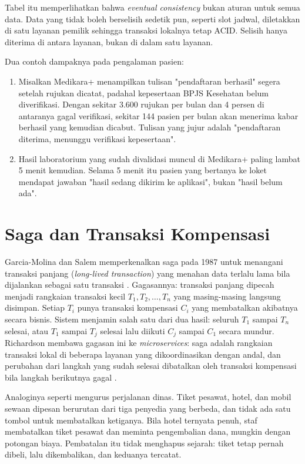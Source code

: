 Tabel itu memperlihatkan bahwa \textit{eventual consistency} bukan aturan untuk semua data. Data
yang tidak boleh berselisih sedetik pun, seperti slot jadwal, diletakkan di satu layanan pemilik
sehingga transaksi lokalnya tetap ACID. Selisih hanya diterima di antara layanan, bukan di dalam
satu layanan.

Dua contoh dampaknya pada pengalaman pasien:
\begin{enumerate}
  \item Misalkan Medikara+ menampilkan tulisan "pendaftaran berhasil" segera setelah rujukan
        dicatat, padahal kepesertaan BPJS Kesehatan belum diverifikasi. Dengan sekitar 3.600
        rujukan per bulan dan 4 persen di antaranya gagal verifikasi, sekitar 144 pasien per bulan
        akan menerima kabar berhasil yang kemudian dicabut. Tulisan yang jujur adalah "pendaftaran
        diterima, menunggu verifikasi kepesertaan".
  \item Hasil laboratorium yang sudah divalidasi muncul di Medikara+ paling lambat 5 menit
        kemudian. Selama 5 menit itu pasien yang bertanya ke loket mendapat jawaban "hasil sedang
        dikirim ke aplikasi", bukan "hasil belum ada".
\end{enumerate}

\section{Saga dan Transaksi Kompensasi}
\label{sec:ch10-saga}

Garcia-Molina dan Salem memperkenalkan saga pada 1987 untuk menangani transaksi panjang
(\textit{long-lived transaction}) yang menahan data terlalu lama bila dijalankan sebagai satu
transaksi \cite{garcia-molina1987}. Gagasannya: transaksi panjang dipecah menjadi rangkaian transaksi
kecil $T_1, T_2, \ldots, T_n$ yang masing-masing langsung disimpan. Setiap $T_i$ punya transaksi
kompensasi $C_i$ yang membatalkan akibatnya secara bisnis. Sistem menjamin salah satu dari dua hasil:
seluruh $T_1$ sampai $T_n$ selesai, atau $T_1$ sampai $T_j$ selesai lalu diikuti $C_j$ sampai $C_1$
secara mundur. Richardson membawa gagasan ini ke \textit{microservices}: saga adalah rangkaian
transaksi lokal di beberapa layanan yang dikoordinasikan dengan andal, dan perubahan dari langkah
yang sudah selesai dibatalkan oleh transaksi kompensasi bila langkah berikutnya gagal
\cite{richardson2018, c10-richardson-saga}.

Analoginya seperti mengurus perjalanan dinas. Tiket pesawat, hotel, dan mobil sewaan dipesan
berurutan dari tiga penyedia yang berbeda, dan tidak ada satu tombol untuk membatalkan ketiganya.
Bila hotel ternyata penuh, staf membatalkan tiket pesawat dan meminta pengembalian dana, mungkin
dengan potongan biaya. Pembatalan itu tidak menghapus sejarah: tiket tetap pernah dibeli, lalu
dikembalikan, dan keduanya tercatat.

